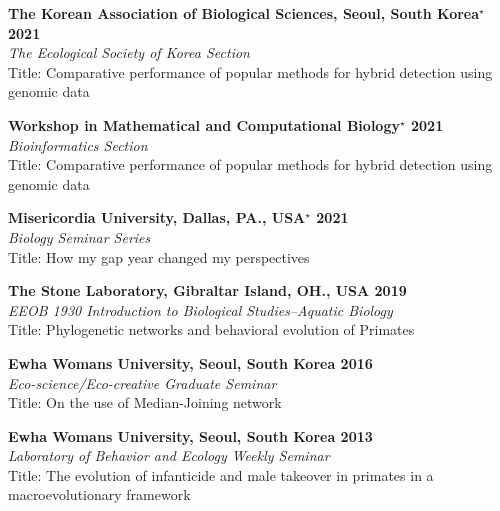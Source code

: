 \documentclass[11pt,letterpaper,sans]{moderncv} %
\begin{document}
\begin{etaremune}
	\item \textbf{The Korean Association of Biological Sciences, Seoul, South Korea$^\star$ \hfill 2021}\\
		{\small \textit{The Ecological Society of Korea Section}\\
		Title: Comparative performance of popular methods for hybrid detection using genomic data}
		
	\item \textbf{Workshop in Mathematical and Computational Biology$^\star$ \hfill 2021}\\
		{\small \textit{Bioinformatics Section}\\
		Title: Comparative performance of popular methods for hybrid detection using genomic data}

	\item \textbf{Misericordia University, Dallas, PA., USA$^\star$ \hfill 2021}\\
		{\small \textit{Biology Seminar Series}\\
		Title: How my gap year changed my perspectives}

	\item \textbf{The Stone Laboratory, Gibraltar Island, OH., USA \hfill 2019}\\
		{\small \textit{EEOB 1930 Introduction to Biological Studies--Aquatic Biology}\\
		Title: Phylogenetic networks and behavioral evolution of Primates}

	\item \textbf{Ewha Womans University, Seoul, South Korea \hfill 2016}\\
		{\small \textit{Eco-science/Eco-creative Graduate Seminar}\\
		Title: On the use of Median-Joining network}

	\item \textbf{Ewha Womans University, Seoul, South Korea \hfill 2013}\\
		{\small \textit{Laboratory of Behavior and Ecology Weekly Seminar}\\
		Title: The evolution of infanticide and male takeover in primates in a macroevolutionary framework}
\end{etaremune}
\end{document}
